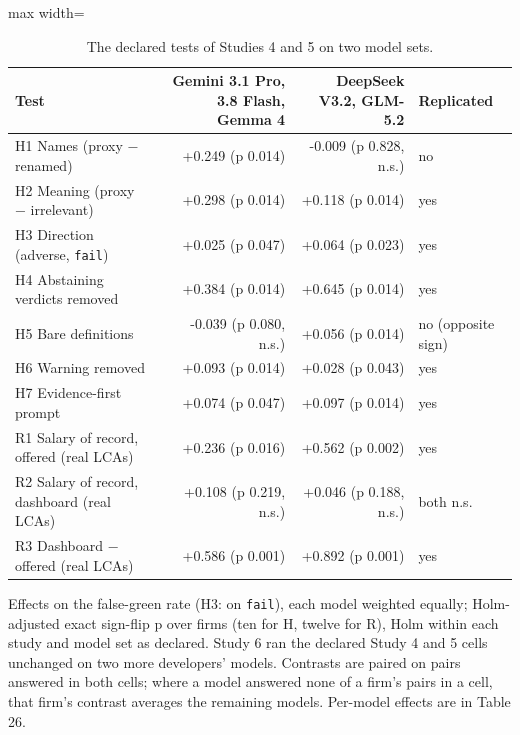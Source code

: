 \documentclass[10pt,twocolumn]{article}
\begin{document}
\begin{table}[t]
\centering\footnotesize\setlength{\tabcolsep}{4pt}
\caption{The declared tests of Studies 4 and 5 on two model sets.}
\label{tab:6}
\begin{adjustbox}{max width=\textwidth}
\begin{tabular}{lrrl}
\toprule
\textbf{Test} & \textbf{Gemini 3.1 Pro, 3.8 Flash, Gemma 4} & \textbf{DeepSeek V3.2, GLM-5.2} & \textbf{Replicated} \\
\midrule
H1 Names (proxy − renamed) & +0.249 (p 0.014) & -0.009 (p 0.828, n.s.) & no \\
H2 Meaning (proxy − irrelevant) & +0.298 (p 0.014) & +0.118 (p 0.014) & yes \\
H3 Direction (adverse, \texttt{fail}) & +0.025 (p 0.047) & +0.064 (p 0.023) & yes \\
H4 Abstaining verdicts removed & +0.384 (p 0.014) & +0.645 (p 0.014) & yes \\
H5 Bare definitions & -0.039 (p 0.080, n.s.) & +0.056 (p 0.014) & no (opposite sign) \\
H6 Warning removed & +0.093 (p 0.014) & +0.028 (p 0.043) & yes \\
H7 Evidence-first prompt & +0.074 (p 0.047) & +0.097 (p 0.014) & yes \\
R1 Salary of record, offered (real LCAs) & +0.236 (p 0.016) & +0.562 (p 0.002) & yes \\
R2 Salary of record, dashboard (real LCAs) & +0.108 (p 0.219, n.s.) & +0.046 (p 0.188, n.s.) & both n.s. \\
R3 Dashboard − offered (real LCAs) & +0.586 (p 0.001) & +0.892 (p 0.001) & yes \\
\bottomrule
\end{tabular}
\end{adjustbox}
\par\vspace{3pt}\begin{minipage}{\textwidth}\scriptsize Effects on the false-green rate (H3: on \texttt{fail}), each model weighted equally; Holm-adjusted exact sign-flip p over firms (ten for H, twelve for R), Holm within each study and model set as declared. Study 6 ran the declared Study 4 and 5 cells unchanged on two more developers' models. Contrasts are paired on pairs answered in both cells; where a model answered none of a firm's pairs in a cell, that firm's contrast averages the remaining models. Per-model effects are in Table 26.\end{minipage}
\end{table}
\end{document}
